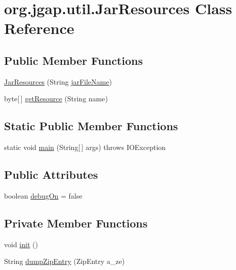 \hypertarget{classorg_1_1jgap_1_1util_1_1_jar_resources}{\section{org.\-jgap.\-util.\-Jar\-Resources Class Reference}
\label{classorg_1_1jgap_1_1util_1_1_jar_resources}
}
\subsection*{Public Member Functions}
\begin{DoxyCompactItemize}
\item 
\hyperlink{classorg_1_1jgap_1_1util_1_1_jar_resources_a8b999804c08b2e3538cbfaca65eb8338}{Jar\-Resources} (String \hyperlink{classorg_1_1jgap_1_1util_1_1_jar_resources_a2ff183e8160357870aabbb7ff4f75000}{jar\-File\-Name})
\item 
byte\mbox{[}$\,$\mbox{]} \hyperlink{classorg_1_1jgap_1_1util_1_1_jar_resources_a0bc2aafef5ea7008210ca9b8d062f8f6}{get\-Resource} (String name)
\end{DoxyCompactItemize}
\subsection*{Static Public Member Functions}
\begin{DoxyCompactItemize}
\item 
static void \hyperlink{classorg_1_1jgap_1_1util_1_1_jar_resources_a968a933bc152943b2061e18bcdf47638}{main} (String\mbox{[}$\,$\mbox{]} args)  throws I\-O\-Exception 
\end{DoxyCompactItemize}
\subsection*{Public Attributes}
\begin{DoxyCompactItemize}
\item 
boolean \hyperlink{classorg_1_1jgap_1_1util_1_1_jar_resources_a6fb6af86133aedc3f98c20a8b9c2e7cb}{debug\-On} = false
\end{DoxyCompactItemize}
\subsection*{Private Member Functions}
\begin{DoxyCompactItemize}
\item 
void \hyperlink{classorg_1_1jgap_1_1util_1_1_jar_resources_a5706d9a2bcb6f8f15fb19bbb66c500d7}{init} ()
\item 
String \hyperlink{classorg_1_1jgap_1_1util_1_1_jar_resources_a708238d14bdf020bd085c066ef7156e9}{dump\-Zip\-Entry} (Zip\-Entry a\-\_\-ze)
\end{DoxyCompactItemize}
